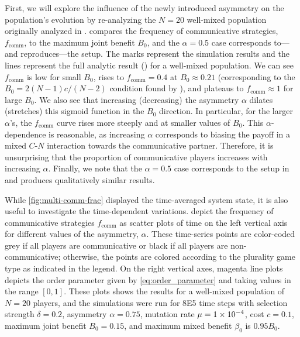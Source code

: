 \documentclass[pdflatex,lineno,referee,sn-nature]{sn-jnl}
\begin{document}
First, we will explore the influence of the newly introduced asymmetry
on the population's evolution by
re-analyzing the $N=20$ well-mixed population
originally analyzed in \tripp{}.
 compares the frequency of communicative strategies,
$f_{\text{comm}}$, to the maximum joint benefit $B_0$,
and the $\alpha=0.5$ case corresponds to---and reproduces---the
\tripp{} setup.
The marks represent the simulation results
and the lines represent the full analytic
result () for a well-mixed population.
We can see $f_{\text{comm}}$ is low for small $B_0$,
rises to $f_{\text{comm}} = 0.4$ at $B_0 \approx 0.21$
(corresponding to the $B_0 = 2 (N-1) c/(N-2)$ condition
found by \tripp{}),
and plateaus to $f_{\text{comm}} \approx 1$ for large $B_0$.
We also see that increasing (decreasing)
the asymmetry $\alpha$ dilates (stretches) this sigmoid function
in the $B_0$ direction.
In particular, for the larger $\alpha$'s, the $f_{\text{comm}}$ curve
rises more steeply and at smaller values of $B_0$.
This $\alpha$-dependence is reasonable,
as increasing $\alpha$ corresponds to biasing the payoff
in a mixed $C$-$N$ interaction towards the communicative partner.
Therefore, it is unsurprising that the proportion of communicative players
increases with increasing $\alpha$.
Finally, we note that the $\alpha = 0.5$ case corresponds
to the setup in \tripp{}
and produces qualitatively similar results.

While \cref{fig:multi-comm-frac} displayed
the time-averaged system state,
it is also useful to investigate the time-dependent variations.
depict the frequency
of communicative strategies $f_{\text{comm}}$
as scatter plots of time on the left vertical axis
for different values of the asymmetry, $\alpha$.
These time-series points are color-coded
grey if all players are communicative or
black if all players are non-communicative;
otherwise, the points are colored according
to the plurality game type as indicated in the legend.
On the right vertical axes,
magenta line plots depicts the order parameter
given by \cref{eq:order_parameter} and
taking values in the range $[0,1]$.
These plots shows the results
for a well-mixed population of $N=20$ players,
and the simulations were run
for \num{8E5} time steps with
selection strength $\delta = 0.2$,
asymmetry $\alpha = 0.75$,
mutation rate $\mu=\num{1E-4}$,
cost $c = \num{0.1}$,
maximum joint benefit $B_0 = 0.15$,
and maximum mixed benefit $\beta_0$ is $\num{0.95} B_0$.
\end{document}
